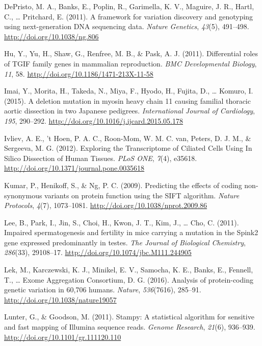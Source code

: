 \documentclass[12pt,twoside]{reedthesis}
\theoremstyle{definition}
\theoremstyle{definition}
\theoremstyle{remark}
\begin{document}
  \hypertarget{ref-DePristo2011}{}
  DePristo, M. A., Banks, E., Poplin, R., Garimella, K. V., Maguire, J.
  R., Hartl, C., \ldots{} Pritchard, E. (2011). A framework for variation
  discovery and genotyping using next-generation DNA sequencing data.
  \emph{Nature Genetics}, \emph{43}(5), 491--498.
  \url{http://doi.org/10.1038/ng.806}
  
  \hypertarget{ref-Hu2011}{}
  Hu, Y., Yu, H., Shaw, G., Renfree, M. B., \& Pask, A. J. (2011).
  Differential roles of TGIF family genes in mammalian reproduction.
  \emph{BMC Developmental Biology}, \emph{11}, 58.
  \url{http://doi.org/10.1186/1471-213X-11-58}
  
  \hypertarget{ref-Imai2015}{}
  Imai, Y., Morita, H., Takeda, N., Miya, F., Hyodo, H., Fujita, D.,
  \ldots{} Komuro, I. (2015). A deletion mutation in myosin heavy chain 11
  causing familial thoracic aortic dissection in two Japanese pedigrees.
  \emph{International Journal of Cardiology}, \emph{195}, 290--292.
  \url{http://doi.org/10.1016/j.ijcard.2015.05.178}
  
  \hypertarget{ref-Ivliev2012}{}
  Ivliev, A. E., 't Hoen, P. A. C., Roon-Mom, W. M. C. van, Peters, D. J.
  M., \& Sergeeva, M. G. (2012). Exploring the Transcriptome of Ciliated
  Cells Using In Silico Dissection of Human Tissues. \emph{PLoS ONE},
  \emph{7}(4), e35618. \url{http://doi.org/10.1371/journal.pone.0035618}
  
  \hypertarget{ref-Kumar2009}{}
  Kumar, P., Henikoff, S., \& Ng, P. C. (2009). Predicting the effects of
  coding non-synonymous variants on protein function using the SIFT
  algorithm. \emph{Nature Protocols}, \emph{4}(7), 1073--1081.
  \url{http://doi.org/10.1038/nprot.2009.86}
  
  \hypertarget{ref-Lee2011}{}
  Lee, B., Park, I., Jin, S., Choi, H., Kwon, J. T., Kim, J., \ldots{}
  Cho, C. (2011). Impaired spermatogenesis and fertility in mice carrying
  a mutation in the Spink2 gene expressed predominantly in testes.
  \emph{The Journal of Biological Chemistry}, \emph{286}(33), 29108--17.
  \url{http://doi.org/10.1074/jbc.M111.244905}
  
  \hypertarget{ref-Lek2016}{}
  Lek, M., Karczewski, K. J., Minikel, E. V., Samocha, K. E., Banks, E.,
  Fennell, T., \ldots{} Exome Aggregation Consortium, D. G. (2016).
  Analysis of protein-coding genetic variation in 60,706 humans.
  \emph{Nature}, \emph{536}(7616), 285--91.
  \url{http://doi.org/10.1038/nature19057}
  
  \hypertarget{ref-Lunter2011}{}
  Lunter, G., \& Goodson, M. (2011). Stampy: A statistical algorithm for
  sensitive and fast mapping of Illumina sequence reads. \emph{Genome
  Research}, \emph{21}(6), 936--939.
  \url{http://doi.org/10.1101/gr.111120.110}
  
\end{document}
